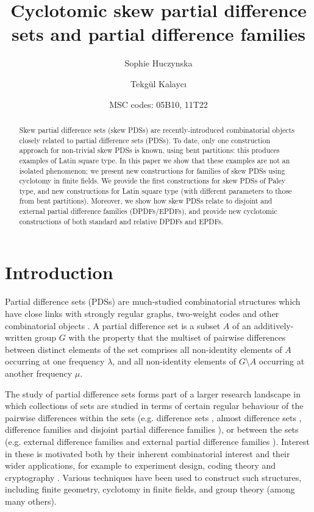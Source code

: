 \documentclass[12pt, a4paper]{article}
\title{Cyclotomic skew partial difference sets and partial difference families}
\author[1] {Sophie Huczynska}
\author[2] {Tekg\"{u}l Kalayc\i}
\affil[1]{School of Mathematics and Statistics, University of St Andrews, St Andrews, KY16 9SS, Scotland, UK; email: sh70@st-andrews.ac.uk}
\affil[2]{Institut f\"ur Mathematik, Alpen-Adria-Universit\"at Klagenfurt, Austria; email: tekgulkalayci1@gmail.com}
\date{MSC codes: 05B10, 11T22}
\theoremstyle{definition}
\begin{document}
\maketitle

\begin{abstract}
Skew partial difference sets (skew PDSs) are recently-introduced combinatorial objects closely related to partial difference sets (PDSs). To date, only one construction approach for non-trivial skew PDSs is known, using bent partitions: this produces examples of Latin square type.  In this paper we show that these examples are not an isolated phenomenon; we present new constructions for families of skew PDSs using cyclotomy in finite fields. We provide the first constructions for skew PDSs of Paley type, and new constructions for Latin square type (with different parameters to those from bent partitions).  Moreover, we show how skew PDSs relate to disjoint and external partial difference families (DPDFs/EPDFs), and provide new cyclotomic constructions of both standard and relative DPDFs and EPDFs.
\end{abstract}

\section{Introduction}

Partial difference sets (PDSs) are much-studied combinatorial structures which have close links with strongly regular graphs, two-weight codes and other combinatorial objects \cite{CalKan,Ma84,Ma94,MomWanXia}.  A partial difference set is a subset $A$ of an additively-written group $G$ with the property that the multiset of pairwise differences between distinct elements of the set comprises all non-identity elements of $A$ occurring at one frequency $\lambda$, and all non-identity elements of $G \setminus A$ occurring at another frequency $\mu$.  

The study of partial difference sets forms part of a larger research landscape in which collections of sets are studied in terms of certain regular behaviour of the pairwise differences within the sets (e.g. difference sets \cite{Sto}, almost difference sets \cite{Ara,DinPotWan}, difference families \cite{Bur} and disjoint partial difference families \cite{HucJoh}), or between the sets (e.g. external difference families \cite{ChaDin,PatSti} and external partial difference families \cite{HucJoh}).  Interest in these is motivated both by their inherent combinatorial interest and their wider applications, for example to experiment design, coding theory and cryptography \cite{PatSti}.  Various techniques have been used to construct such structures, including finite geometry, cyclotomy in finite fields, and group theory (among many others).
\end{document}

